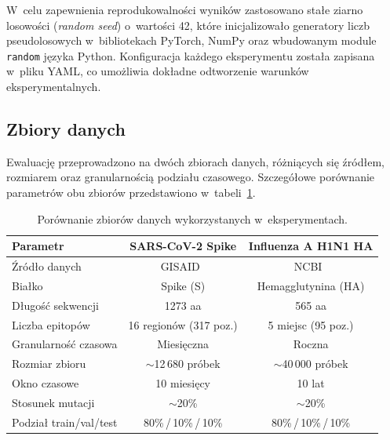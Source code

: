 W~celu zapewnienia reprodukowalności wyników zastosowano stałe ziarno losowości (\textit{random seed}) o~wartości 42, które inicjalizowało generatory liczb pseudolosowych w~bibliotekach PyTorch, NumPy oraz wbudowanym module \texttt{random} języka Python. Konfiguracja każdego eksperymentu została zapisana w~pliku YAML, co umożliwia dokładne odtworzenie warunków eksperymentalnych.

\subsection{Zbiory danych}

Ewaluację przeprowadzono na dwóch zbiorach danych, różniących się źródłem, rozmiarem oraz granularnością podziału czasowego. Szczegółowe porównanie parametrów obu zbiorów przedstawiono w~tabeli~\ref{tab:datasets}.

\begin{table}[H]
    \centering
    \caption{Porównanie zbiorów danych wykorzystanych w~eksperymentach.}
    \label{tab:datasets}
    \begin{tabular}{lcc}
        \toprule
        \textbf{Parametr} & \textbf{SARS-CoV-2 Spike} & \textbf{Influenza A H1N1 HA} \\
        \midrule
        Źródło danych          & GISAID~\cite{elbe2017gisaid}  & NCBI~\cite{bao2008ncbi} \\
        Białko                 & Spike (S)                     & Hemagglutynina (HA) \\
        Długość sekwencji      & 1273 aa                       & 565 aa \\
        Liczba epitopów        & 16 regionów (317 poz.)        & 5 miejsc (95 poz.) \\
        Granularność czasowa   & Miesięczna                    & Roczna \\
        Rozmiar zbioru         & $\sim$12\,680 próbek          & $\sim$40\,000 próbek \\
        Okno czasowe           & 10 miesięcy                   & 10 lat \\
        Stosunek mutacji       & $\sim$20\%                    & $\sim$20\% \\
        Podział train/val/test & 80\%\,/\,10\%\,/\,10\%       & 80\%\,/\,10\%\,/\,10\% \\
        \bottomrule
    \end{tabular}
\end{table}


